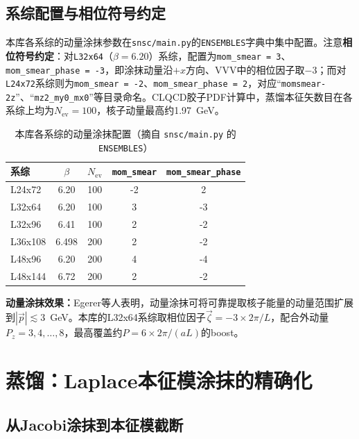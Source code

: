 \documentclass[12pt,a4paper]{ctexart}
\theoremstyle{definition}
\begin{document}
\subsection{系综配置与相位符号约定}

本库各系综的动量涂抹参数在\texttt{snsc/main.py}的\texttt{ENSEMBLES}字典中集中配置。注意\textbf{相位符号约定}：对\texttt{L32x64}（$\beta=6.20$）系综，配置为\texttt{mom\_smear = 3}、\texttt{mom\_smear\_phase = -3}，即涂抹动量沿$+x$方向、VVV中的相位因子取$-3$；而对\texttt{L24x72}系综则为\texttt{mom\_smear = -2}、\texttt{mom\_smear\_phase = 2}，对应``\texttt{momsmear-2z}''、``\texttt{mz2\_my0\_mx0}''等目录命名。CLQCD胶子PDF计算中，蒸馏本征矢数目在各系综上均为$N_{\text{ev}} = 100$，核子动量最高约1.97~GeV\cite{Chen2025gluon}。

\begin{table}[H]
\centering
\caption{本库各系综的动量涂抹配置（摘自 \texttt{snsc/main.py} 的 \texttt{ENSEMBLES}）}
\label{tab:ensembles}
\begin{tabular}{lcccc}
\toprule
系综 & $\beta$ & $N_{\text{ev}}$ & \texttt{mom\_smear} & \texttt{mom\_smear\_phase} \\
\midrule
L24x72 & 6.20 & 100 & -2 & 2 \\
L32x64 & 6.20 & 100 & 3 & -3 \\
L32x96 & 6.41 & 100 & 2 & -2 \\
L36x108 & 6.498 & 200 & 2 & -2 \\
L48x96 & 6.20 & 200 & 4 & -4 \\
L48x144 & 6.72 & 200 & 2 & -2 \\
\bottomrule
\end{tabular}
\end{table}

\textbf{动量涂抹效果：}Egerer等人\cite{Egerer2021a}表明，动量涂抹可将可靠提取核子能量的动量范围扩展到$|\vec{p}| \lesssim 3$~GeV。本库的L32x64系综取相位因子$\vec{\zeta} = -3 \times 2\pi/L$，配合外动量$P_z = 3,4,\ldots,8$，最高覆盖约$P = 6 \times 2\pi/(aL)$的boost\cite{NoteGluonPDFs}。

\section{蒸馏：Laplace本征模涂抹的精确化}

\subsection{从Jacobi涂抹到本征模截断}
\end{document}
